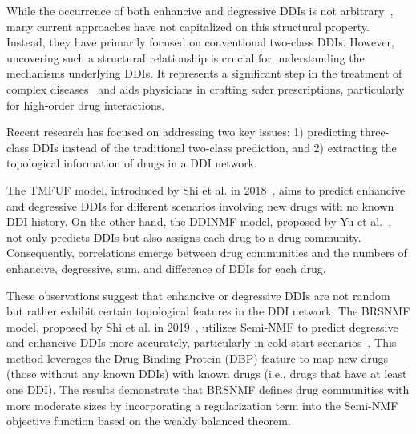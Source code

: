 \documentclass[unnumsec,webpdf,contemporary,large]{oup-authoring-template}%
\theoremstyle{thmstyleone}%
\theoremstyle{thmstyletwo}%
\theoremstyle{thmstylethree}%
\begin{document}
While the occurrence of both enhancive and degressive DDIs is not arbitrary~\cite{Shi2018, Yu2018}, many current approaches have not capitalized on this structural property. Instead, they have primarily focused on conventional two-class DDIs. However, uncovering such a structural relationship is crucial for understanding the mechanisms underlying DDIs. It represents a significant step in the treatment of complex diseases~\cite{Cokol2017} and aids physicians in crafting safer prescriptions, particularly for high-order drug interactions.

Recent research has focused on addressing two key issues: 1) predicting three-class DDIs instead of the traditional two-class prediction, and 2) extracting the topological information of drugs in a DDI network.

The TMFUF model, introduced by Shi et al. in 2018~\cite{Shi2018}, aims to predict enhancive and degressive DDIs for different scenarios involving new drugs with no known DDI history. On the other hand, the DDINMF model, proposed by Yu et al.~\cite{Yu2018}, not only predicts DDIs but also assigns each drug to a drug community. Consequently, correlations emerge between drug communities and the numbers of enhancive, degressive, sum, and difference of DDIs for each drug.

These observations suggest that enhancive or degressive DDIs are not random but rather exhibit certain topological features in the DDI network. The BRSNMF model, proposed by Shi et al. in 2019~\cite{Shi2019}, utilizes Semi-NMF to predict degressive and enhancive DDIs more accurately, particularly in cold start scenarios~\cite{lesly2018}. This method leverages the Drug Binding Protein (DBP) feature to map new drugs (those without any known DDIs) with known drugs (i.e., drugs that have at least one DDI). The results demonstrate that BRSNMF defines drug communities with more moderate sizes by incorporating a regularization term into the Semi-NMF objective function based on the weakly balanced theorem.
\end{document}
